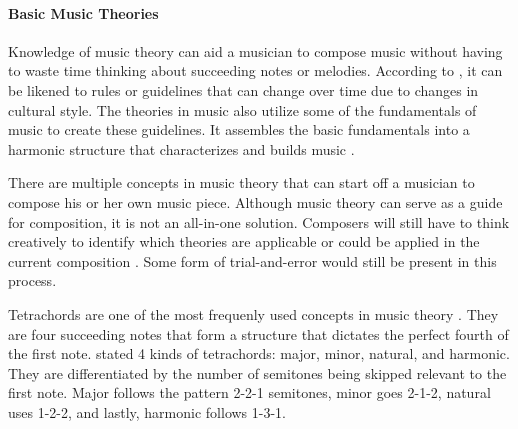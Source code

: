         \paragraph{Basic Music Theories}
        
        Knowledge of music theory can aid a musician to compose music without having to waste time thinking about succeeding notes or melodies. According to \citet{meyer1989style}, it can be likened to rules or guidelines that can change over time due to changes in cultural style. The theories in music also utilize some of the fundamentals of music to create these guidelines. It assembles the basic fundamentals into a harmonic structure that characterizes and builds music \citep{meyer1989style}.
        
        
        There are multiple concepts in music theory that can start off a musician to compose his or her own music piece. Although music theory can serve as a guide for composition, it is not an all-in-one solution. Composers will still have to think creatively to identify which theories are applicable or could be applied in the current composition \citep{meyer1989style}. Some form of trial-and-error would still be present in this process.
        
        
        Tetrachords are one of the most frequenly used concepts in music theory \citep{spencer1996music}. They are four succeeding notes that form a structure that dictates the perfect fourth of the first note. \citet{spencer1996music} stated 4 kinds of tetrachords: major, minor, natural, and harmonic. They are differentiated by the number of semitones being skipped relevant to the first note. Major follows the pattern 2-2-1 semitones, minor goes 2-1-2, natural uses 1-2-2, and lastly, harmonic follows 1-3-1. 
        
